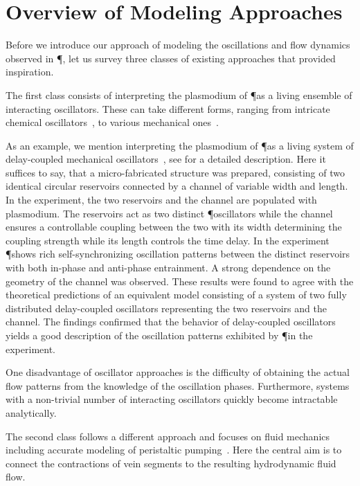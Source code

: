 
\section{Overview of Modeling Approaches}\label{sec:model}

  Before we introduce our approach of modeling the oscillations and flow dynamics observed in \P, let us survey three classes of existing approaches that provided inspiration. 

  The first class consists of interpreting the plasmodium of \P as a living ensemble of interacting oscillators. These can take different forms, ranging from intricate chemical oscillators~\cite{Smith1992368}, to various mechanical ones~\cite{PhysRevLett.85.2026,tero2005coupled,takamatsu2001spatiotemporal}. 

  As an example, we mention interpreting the plasmodium of \P as a living system of delay-coupled mechanical oscillators~\cite{PhysRevLett.85.2026}, see  for a detailed description. Here it suffices to say, that a micro-fabricated structure was prepared, consisting of two identical circular reservoirs connected by a channel of variable width and length. In the experiment, the two reservoirs and the channel are populated with plasmodium. The reservoirs act as two distinct \P oscillators while the channel ensures a controllable coupling between the two with its width determining the coupling strength while its length controls the time delay. In the experiment \P shows rich self-synchronizing oscillation patterns between the distinct reservoirs with both in-phase and anti-phase entrainment. A strong dependence on the geometry of the channel was observed. These results were found to agree with the theoretical predictions of an equivalent model consisting of a system of two fully distributed delay-coupled oscillators representing the two reservoirs and the channel. The findings confirmed that the behavior of delay-coupled oscillators yields a good description of the oscillation patterns exhibited by \P in the experiment.

  One disadvantage of oscillator approaches is the difficulty of obtaining the actual flow patterns from the knowledge of the oscillation phases. Furthermore, systems with a non-trivial number of interacting oscillators quickly become intractable analytically.

  The second class follows a different approach and focuses on fluid mechanics including accurate modeling of peristaltic pumping~\cite{alim2013random,teplov1991continuum}. Here the central aim is to connect the contractions of vein segments to the resulting hydrodynamic fluid flow.

